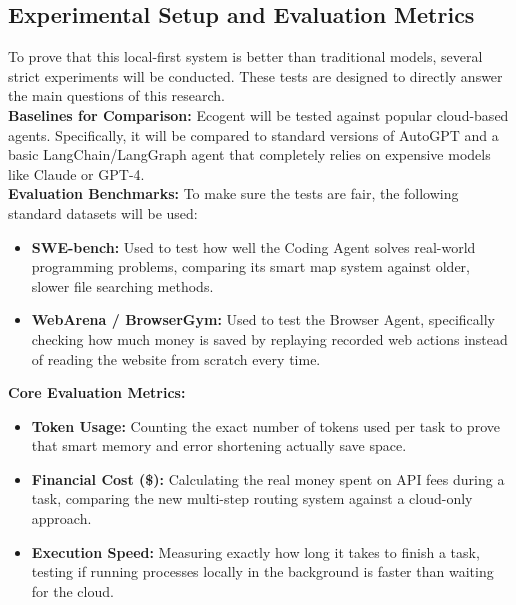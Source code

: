 \subsection{Experimental Setup and Evaluation Metrics}
To prove that this local-first system is better than traditional models, several strict experiments will be conducted. These tests are designed to directly answer the main questions of this research.\\

\textbf{Baselines for Comparison:}
Ecogent will be tested against popular cloud-based agents. Specifically, it will be compared to standard versions of AutoGPT and a basic LangChain/LangGraph agent that completely relies on expensive models like Claude or GPT-4.\\

\textbf{Evaluation Benchmarks:}
To make sure the tests are fair, the following standard datasets will be used:\\
\begin{itemize}
    \item \textbf{SWE-bench:} Used to test how well the Coding Agent solves real-world programming problems, comparing its smart map system against older, slower file searching methods.
    \item \textbf{WebArena / BrowserGym:} Used to test the Browser Agent, specifically checking how much money is saved by replaying recorded web actions instead of reading the website from scratch every time.
\end{itemize}

\textbf{Core Evaluation Metrics:}
\begin{itemize}
    \item \textbf{Token Usage:} Counting the exact number of tokens used per task to prove that smart memory and error shortening actually save space.
    \item \textbf{Financial Cost (\$):} Calculating the real money spent on API fees during a task, comparing the new multi-step routing system against a cloud-only approach.
    \item \textbf{Execution Speed:} Measuring exactly how long it takes to finish a task, testing if running processes locally in the background is faster than waiting for the cloud.
\end{itemize}

